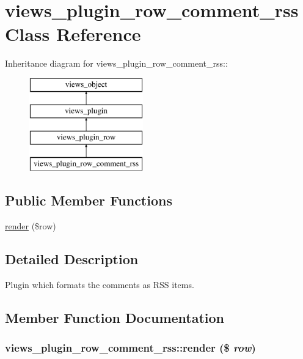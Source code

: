 \hypertarget{classviews__plugin__row__comment__rss}{
\section{views\_\-plugin\_\-row\_\-comment\_\-rss Class Reference}
\label{classviews__plugin__row__comment__rss}
}
Inheritance diagram for views\_\-plugin\_\-row\_\-comment\_\-rss::\begin{figure}[H]
\begin{center}
\leavevmode
\includegraphics[height=4cm]{classviews__plugin__row__comment__rss}
\end{center}
\end{figure}
\subsection*{Public Member Functions}
\begin{CompactItemize}
\item 
\hyperlink{classviews__plugin__row__comment__rss_89b115cbc1807d3b9659627f351b97e7}{render} (\$row)
\end{CompactItemize}


\subsection{Detailed Description}
Plugin which formats the comments as RSS items. 

\subsection{Member Function Documentation}
\hypertarget{classviews__plugin__row__comment__rss_89b115cbc1807d3b9659627f351b97e7}{
\subsubsection[{render}]{\setlength{\rightskip}{0pt plus 5cm}views\_\-plugin\_\-row\_\-comment\_\-rss::render (\$ {\em row})}}
\label{classviews__plugin__row__comment__rss_89b115cbc1807d3b9659627f351b97e7}


